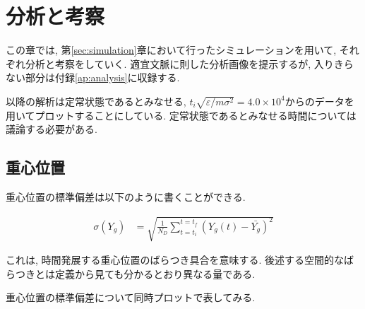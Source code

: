 \chapter{分析と考察}

この章では, 第\ref{sec:simulation}章において行ったシミュレーションを用いて, それぞれ分析と考察をしていく. 適宜文脈に則した分析画像を提示するが, 入りきらない部分は付録\ref{ap:analysis}に収録する.

以降の解析は定常状態であるとみなせる, $t_i \sqrt{\varepsilon / m \sigma^2} = 4.0 \times 10^{4}$からのデータを用いてプロットすることにしている. 定常状態であるとみなせる時間については議論する必要がある.

\section{重心位置}


重心位置の標準偏差は以下のように書くことができる.

\begin{align}
  \sigma (Y_g) &= \sqrt{\frac{1}{N_{D}}\sum_{t=t_i}^{t=t_f} (Y_{g}(t) - \bar{Y_g})^2}
\end{align}

これは, 時間発展する重心位置のばらつき具合を意味する. 後述する空間的なばらつきとは定義から見ても分かるとおり異なる量である.

重心位置の標準偏差について同時プロットで表してみる. 

